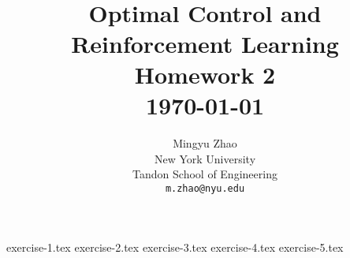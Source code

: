 \documentclass{article}
\title{
    \normalsize \textsc{} \\[2.0cm]
    \HRule{1pt} \\[0.3cm]
    \LARGE \textbf{Optimal Control and Reinforcement Learning}
    \HRule{1pt} \\[0.5cm]
    \Large Homework 2 \\[0.5cm]
    \normalsize \today            %
}
\author{
    Mingyu Zhao \\
    New York University \\
    Tandon School of Engineering \\
    \texttt{m.zhao@nyu.edu} \\
}
\makeatletter
\def\printtitle{
    {\centering \@title\par}}
\def\printauthor{
    {\centering \large \@author}}
\makeatother
\begin{document}
\thispagestyle{empty}
\printtitle%
      \vfill
\printauthor%
\newpage

{exercise-1.tex}
{exercise-2.tex}
{exercise-3.tex}
{exercise-4.tex}
{exercise-5.tex}
\end{document}
